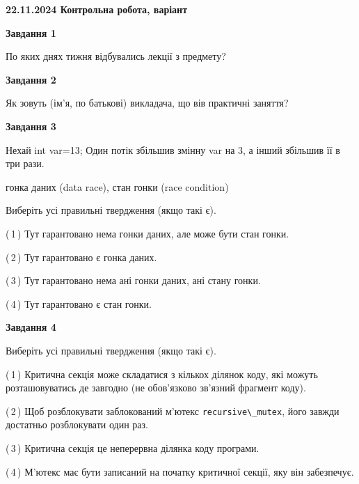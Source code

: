 \documentclass[12pt, ukrainian]{article}
\def\code#1{\Verb!#1!}
\begin{document}
\begin {large}

\textbf{22.11.2024 Контрольна робота, варіант  }\par


{

\begin{center}
\textbf{Завдання 1}
\end{center}

По яких днях тижня відбувались лекції з предмету?


\begin{center}
\textbf{Завдання 2}
\end{center}

Як зовуть (ім'я, по батькові) викладача, що вів практичні заняття?


\begin{center}
\textbf{Завдання 3}
\end{center}

Нехай int var=13; Один потік збільшив змінну var на 3, а інший збільшив її в три рази.

гонка даних (data race), стан гонки (race condition)

Виберіть усі правильні твердження (якщо такі є).\par
\vspace{2mm}
(\,1\,) Тут гарантовано нема гонки даних, але може бути стан гонки.%

(\,2\,) Тут гарантовано є гонка даних.%

(\,3\,) Тут гарантовано нема ані гонки даних, ані стану гонки.%

(\,4\,) Тут гарантовано є стан гонки.%


\begin{center}
\textbf{Завдання 4}
\end{center}

Виберіть усі правильні твердження (якщо такі є).\par
\vspace{2mm}

(\,1\,) Критична секція може складатися з кількох ділянок коду, які можуть розташовуватись де завгодно (не обов’язково зв’язний фрагмент коду).%

(\,2\,) Щоб розблокувати заблокований м’ютекс \code{recursive\_mutex}, його завжди достатньо розблокувати один раз.%

(\,3\,) Критична секція це неперервна ділянка коду програми.%

(\,4\,) М’ютекс має бути записаний на початку критичної секції, яку він забезпечує.%


}
\end{large}
\end{document}
